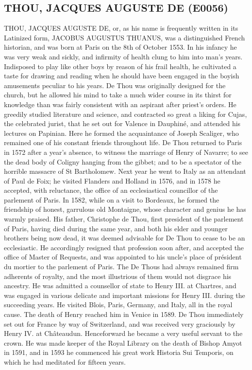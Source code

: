 \documentclass{article}
\begin{document}
\subsection*{THOU, JACQUES AUGUSTE DE (E0056)}
THOU, JACQUES AUGUSTE DE, or, as his name is frequently written in its Latinized form, JACOBUS AUGUSTUS THUANUS, was a distinguished French historian, and was born at Paris on the 8th of October 1553. In his infancy he was very weak and sickly, and infirmity of health clung to him into man's years. Indisposed to play like other boys by reason of his frail health, he cultivated a taste for drawing and reading when he should have been engaged in the boyish amusements peculiar to his years. De Thou was originally designed for the church, but he allowed his mind to take a much wider course in its thirst for knowledge than was fairly consistent with an aspirant after priest's orders. He greedily studied literature and science, and contracted so great a liking for Cujas, the celebrated jurist, that he set out for Valence in Dauphiné, and attended his lectures on Papinian. Here he formed the acquaintance of Joseph Scaliger, who remained one of his constant friends throughout life. De Thou returned to Paris in 1572 after a year's absence, to witness the marriage of Henry of Navarre; to see the dead body of Coligny hanging from the gibbet; and to be a spectator of the horrible massacre of St Bartholomew. Next year he went to Italy as an attendant of Paul de Foix; he visited Flanders and Holland in 1576, and in 1578 he accepted, with reluctance, the office of an ecclesiastical councillor of the parlement of Paris. In 1582, while on a visit to Bordeaux, he formed the friendship of honest, garrulous old Montaigne, whose character and genius he has warmly praised. His father, Christophe de Thou, first president of the parlement of Paris, having died during the same year, and both his elder and younger brothers being now dead, it was deemed advisable for De Thou to cease to be an ecclesiastic. He accordingly resigned that profession soon after, and accepted the office of Master of Requests, and was appointed to his uncle's place of président du mortier to the parlement of Paris. The De Thous had always remained firm adherents of royalty, and the most illustrious of them would not disgrace his ancestry. He was admitted a counsellor of state to Henry III. at Chartres, and was engaged in various delicate and important missions for Henry III. during the succeeding years. He visited Blois, Paris, Germany, and Italy, all in the royal cause. The death of Henry reached him in Venice in 1589. De Thou immediately set out for France by way of Switzerland, and was received very graciously by Henry IV. at Châteaudun. Henceforward he became a very useful servant to the crown. He was made keeper of the Royal Library on the death of Bishop Amyot in 1591, and in 1593 he commenced his great work Historia Sui Temporis, on which he had meditated for fifteen years.
\end{document}
